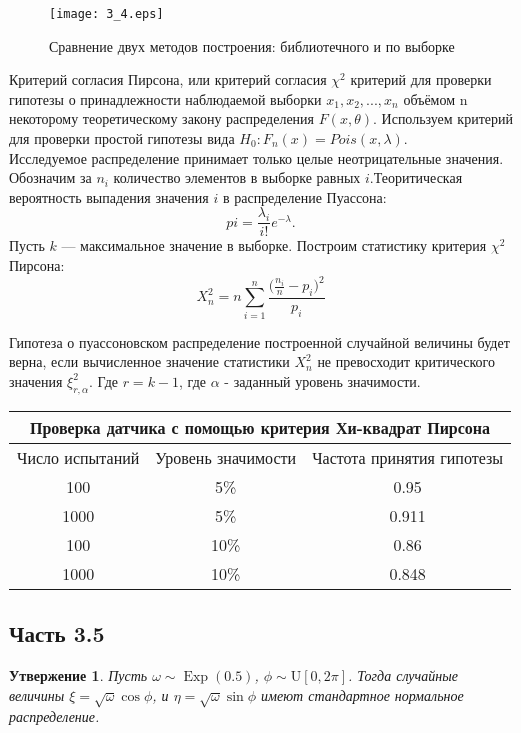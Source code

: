 \documentclass[11pt]{article}
\newtheorem{statement}{Утвержение}[section]
\begin{document}
\begin{figure}[ht]
    \texttt{[image: 3\_4.eps]} 
    \caption{Сравнение двух методов построения: библиотечного и по выборке}
\end{figure} 
\FloatBarrier




Критерий согласия Пирсона, или критерий согласия $\chi^2$ критерий для проверки гипотезы о принадлежности наблюдаемой выборки $x_1 , x_2 , ..., x_n$ объёмом n некоторому теоретическому закону распределения $F(x, \theta)$. Используем критерий для проверки простой гипотезы вида
$H_0 : F_n (x) = Pois(x, \lambda)$. \\
Исследуемое распределение принимает только целые неотрицательные значения.
Обозначим за $n_i$ количество элементов в выборке равных $i$.Теоритическая вероятность выпадения значения $i$ в распределение Пуассона:
$$
pi = \frac{\lambda_i}{i!} e^{-\lambda}.
$$
Пусть $k$ — максимальное значение в выборке. Построим статистику критерия $\chi^2$ Пирсона:
$$
  X_n^2 = n \sum_{i=1}^n \frac{\Big(\frac{n_i}{n} - p_i \Big)^2}{p_i}
$$  

Гипотеза о пуассоновском распределение построенной случайной величины будет
верна, если вычисленное значение статистики $X_n^2$ не превосходит критического значения  $\xi_{r,\alpha}^2$. Где $r = k - 1$, где $\alpha$ - заданный уровень значимости.


\begin{tabular}{|c|c|c|}
\hline
\multicolumn{3}{|c|}{Проверка датчика с помощью критерия Хи-квадрат Пирсона} \\
\hline
Число испытаний & Уровень значимости & Частота принятия гипотезы \\
\hline
100 & 5\% & 0.95 \\
1000 & 5\% & 0.911 \\
100 & 10\% & 0.86 \\
1000 & 10\% & 0.848 \\
\hline
\end{tabular}


\subsection{Часть 3.5}
\begin{statement}
  Пусть $\omega \sim \operatorname{Exp}(0.5)$, $\phi \sim \mathrm{U}[0,2 \pi]$. Тогда случайные величины $\xi=\sqrt{\omega} \cos \phi$, и $\eta=\sqrt{\omega} \sin \phi$ имеют стандартное нормальное распределение.
\end{statement}
\end{document}
